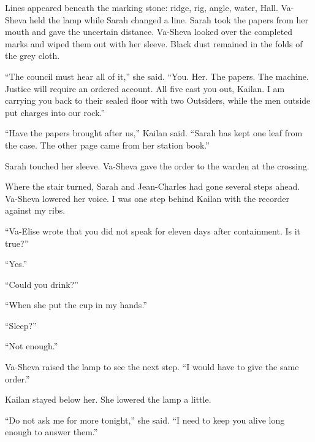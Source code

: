 Lines appeared beneath the marking stone: ridge, rig, angle, water, Hall. Va-Sheva held the lamp while Sarah changed a line. Sarah took the papers from her mouth and gave the uncertain distance. Va-Sheva looked over the completed marks and wiped them out with her sleeve. Black dust remained in the folds of the grey cloth.\par

``The council must hear all of it,'' she said. ``You. Her. The papers. The machine. Justice will require an ordered account. All five cast you out, Kailan. I am carrying you back to their sealed floor with two Outsiders, while the men outside put charges into our rock.''\par

``Have the papers brought after us,'' Kailan said. ``Sarah has kept one leaf from the case. The other page came from her station book.''\par

Sarah touched her sleeve. Va-Sheva gave the order to the warden at the crossing.\par

Where the stair turned, Sarah and Jean-Charles had gone several steps ahead. Va-Sheva lowered her voice. I was one step behind Kailan with the recorder against my ribs.\par

``Va-Elise wrote that you did not speak for eleven days after containment. Is it true?''\par

``Yes.''\par

``Could you drink?''\par

``When she put the cup in my hands.''\par

``Sleep?''\par

``Not enough.''\par

Va-Sheva raised the lamp to see the next step. ``I would have to give the same order.''\par

Kailan stayed below her. She lowered the lamp a little.\par

``Do not ask me for more tonight,'' she said. ``I need to keep you alive long enough to answer them.''\par

